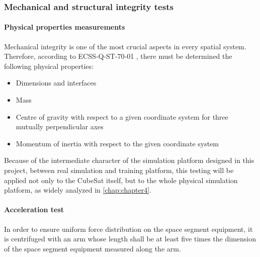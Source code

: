 \subsubsection{Mechanical and structural integrity tests}
\paragraph{Physical properties measurements}

Mechanical integrity is one of the most crucial aspects in every spatial system. Therefore, according to ECSS‐Q‐ST‐70‐01 \cite{ESAhumid}, there must be determined the following physical properties:

\begin{itemize} [noitemsep,topsep=0pt]
	
	\item{Dimensions and interfaces} \\
	\item{Mass} \\
	\item{Centre of gravity with respect to a given coordinate system for three mutually perpendicular axes} \\
	\item{Momentum of inertia with respect to the given coordinate system}

\end{itemize}

Because of the intermediate character of the simulation platform designed in this project, between real simulation and training platform, this testing will be applied not only to the CubeSat itself, but to the whole physical simulation platform, as widely analyzed in \autoref{chap:chapter4}.

\paragraph{Acceleration test}

In order to ensure uniform force distribution on the space segment equipment, it is centrifuged with an arm whose length shall be at least five times the dimension of the space segment equipment measured along the arm. 


